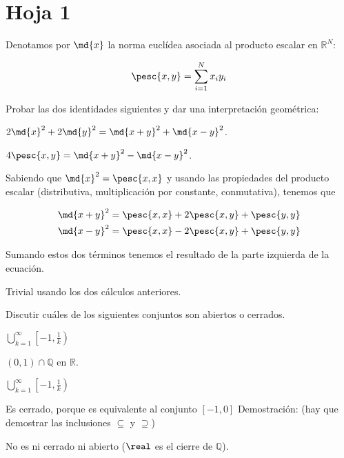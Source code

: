 \section{Hoja 1}

\begin{problem}[1] Denotamos por $\md{x}$ la norma euclídea asociada al producto escalar en $ℝ^N$:

\[ \pesc{x,y} = \sum_{i=1}^Nx_iy_i \]

Probar las dos identidades siguientes y dar una interpretación geométrica:

\ppart $2\md{x}^2 + 2\md{y}^2 = \md{x+y}^2 + \md{x-y}^2$.

\ppart $4\pesc{x,y} = \md{x+y}^2 - \md{x-y}^2$.

\solution

\spart Sabiendo que $\md{x}^2 = \pesc{x,x}$ y usando las propiedades del producto escalar (distributiva, multiplicación por constante, conmutativa), tenemos que

\begin{gather*}
\md{x+y}^2 = \pesc{x,x} + 2\pesc{x,y} + \pesc{y,y} \\
\md{x-y}^2 = \pesc{x,x} - 2\pesc{x,y} + \pesc{y,y}
\end{gather*}

Sumando estos dos términos tenemos el resultado de la parte izquierda de la ecuación.

\spart Trivial usando los dos cálculos anteriores.

\end{problem}

\begin{problem}[3] Discutir cuáles de los siguientes conjuntos son abiertos o cerrados.

\ppart $\displaystyle\bigcup_{k=1}^{\infty} \left[-1,\frac{1}{k}\right)$

\ppart $(0,1)\cap ℚ$ en $ℝ$.
\solution

\spart

$\displaystyle\bigcup_{k=1}^{\infty} \left[-1,\frac{1}{k}\right)$

Es cerrado, porque es equivalente al conjunto $[-1,0]$
Demostración: (hay que demostrar las inclusiones $\subseteq$ y $\supseteq$)

\spart
No es ni cerrado ni abierto ($\real$ es el cierre de $\mathbb{Q}$).

\end{problem}


